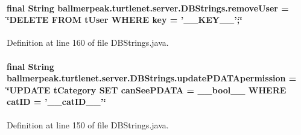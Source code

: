\hypertarget{classballmerpeak_1_1turtlenet_1_1server_1_1DBStrings_a7280cd9a150a098b62c0d23a88eeb566}{
\paragraph[{remove\-User}]{\setlength{\rightskip}{0pt plus 5cm}final String ballmerpeak.\-turtlenet.\-server.\-D\-B\-Strings.\-remove\-User = \char`\"{}D\-E\-L\-E\-T\-E F\-R\-O\-M t\-User W\-H\-E\-R\-E key = '\-\_\-\-\_\-\-K\-E\-Y\-\_\-\-\_\-';\char`\"{}\hspace{0.3cm}{\ttfamily [static]}}}\label{classballmerpeak_1_1turtlenet_1_1server_1_1DBStrings_a7280cd9a150a098b62c0d23a88eeb566}


Definition at line 160 of file D\-B\-Strings.\-java.

\hypertarget{classballmerpeak_1_1turtlenet_1_1server_1_1DBStrings_a1464c2aac4cc5e8112ece2e1840e1976}{
\paragraph[{update\-P\-D\-A\-T\-Apermission}]{\setlength{\rightskip}{0pt plus 5cm}final String ballmerpeak.\-turtlenet.\-server.\-D\-B\-Strings.\-update\-P\-D\-A\-T\-Apermission = \char`\"{}U\-P\-D\-A\-T\-E t\-Category S\-E\-T {\bf can\-See\-P\-D\-A\-T\-A} = \-\_\-\-\_\-bool\-\_\-\-\_\- W\-H\-E\-R\-E cat\-I\-D = '\-\_\-\-\_\-cat\-I\-D\-\_\-\-\_\-'\char`\"{}\hspace{0.3cm}{\ttfamily [static]}}}\label{classballmerpeak_1_1turtlenet_1_1server_1_1DBStrings_a1464c2aac4cc5e8112ece2e1840e1976}


Definition at line 150 of file D\-B\-Strings.\-java.

